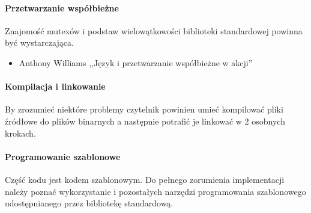 \paragraph{Przetwarzanie współbieżne}
Znajomość mutexów i podstaw wielowątkowości biblioteki standardowej \Cpp{} powinna być wystarczająca.
\begin{itemize}
\item Anthony Williams ,,Język \Cpp{} i przetwarzanie współbieżne w akcji''
\end{itemize}

\paragraph{Kompilacja i linkowanie}
By zrozumieć niektóre problemy czytelnik powinien umieć kompilować pliki źródłowe do plików binarnych a następnie potrafić je linkować w 2 osobnych krokach.

\paragraph{Programowanie szablonowe}
Część kodu jest kodem szablonowym. Do pełnego zorumienia implementacji należy poznać wykorzystanie  i pozostałych narzędzi programowania szablonowego udostępnianego przez bibliotekę standardową.
